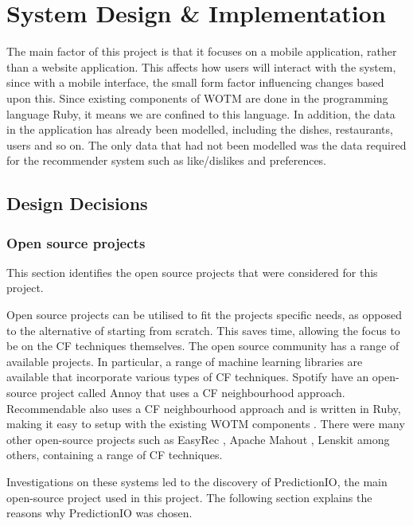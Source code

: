 \chapter{System Design \& Implementation}\label{C:work_done}

The main factor of this project is that it focuses on a mobile application, rather than a website application. This affects how users will interact with the system, since with a mobile interface, the small form factor influencing changes based upon this. Since existing components of WOTM are done in the programming language Ruby, it means we are confined to this language. In addition, the data in the application has already been modelled, including the dishes, restaurants, users and so on. The only data that had not been modelled was the data required for the recommender system such as like/dislikes and preferences.   

\section{Design Decisions}

\subsection{Open source projects}
This section identifies the open source projects that were considered for this project.

Open source projects can be utilised to fit the projects specific needs, as opposed to the alternative of starting from scratch. This saves time, allowing the focus to be on the CF techniques themselves. The open source community has a range of available projects. In particular, a range of machine learning libraries are available that incorporate various types of CF techniques. Spotify \cite{annoy} have an open-source project called Annoy \cite{annoy} that uses a CF neighbourhood approach. Recommendable \cite{recommendable} also uses a CF neighbourhood approach and is written in Ruby, making it easy to setup with the existing WOTM components \cite{recommendable}. There were many other open-source projects such as EasyRec \cite{easyrec}, Apache Mahout \cite{mahoutaction}, Lenskit \cite{lenskit} among others, containing a range of CF techniques. 

Investigations on these systems led to the discovery of PredictionIO, the main open-source project used in this project. The following section explains the reasons why PredictionIO was chosen. 

